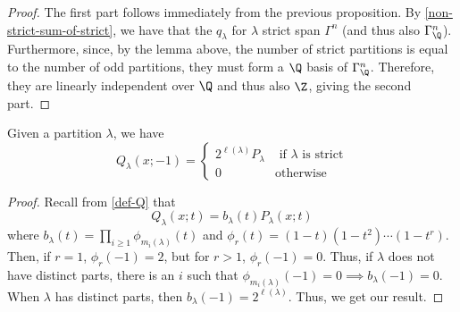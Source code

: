 \documentclass[11pt,leqno,oneside]{amsart}
\numberwithin{thm}{section}
\begin{document}
\begin{proof}
  The first part follows immediately from the previous proposition. By
  \ref{non-strict-sum-of-strict}, we have that the \(q_\lambda\) for
  \(\lambda\) strict span \(\Gamma^n\) (and thus also
  \(\Gamma^n_\Q\)). Furthermore, since, by the lemma above, the number
  of strict partitions is equal to the number of odd partitions, they
  must form a \(\Q\) basis of \(\Gamma^n_\Q\). Therefore, they are
  linearly independent over \(\Q\) and thus also \(\Z\), giving the
  second part.
\end{proof}
\begin{prop}
  Given a partition \(\lambda\), we have \[
    Q_\lambda(x;-1) =
    \begin{cases}
      2^{\ell(\lambda)} P_\lambda & \text{ if }\lambda\text{ is
        strict}\\
      0 & \text{otherwise}
    \end{cases}
  \]
\end{prop}
\begin{proof}
  Recall from \ref{def-Q} that \[
    Q_\lambda(x;t) = b_\lambda(t)P_\lambda(x;t)
  \]
  where \(b_\lambda(t) = \prod_{i \geq 1} \phi_{m_i(\lambda)}(t)\) and
  \(\phi_r(t) = (1-t)(1-t^2)\cdots(1-t^r)\). Then, if \(r = 1\),
  \(\phi_r(-1) = 2\), but for \(r > 1\), \(\phi_r(-1)=0\). Thus, if
  \(\lambda\) does not have distinct parts, there is an \(i\) such
  that \(\phi_{m_i(\lambda)}(-1) = 0 \implies b_\lambda(-1) =
  0\). When \(\lambda\) has distinct parts, then \(b_\lambda(-1) =
  2^{\ell(\lambda)}\). Thus, we get our result.
\end{proof}
\end{document}
